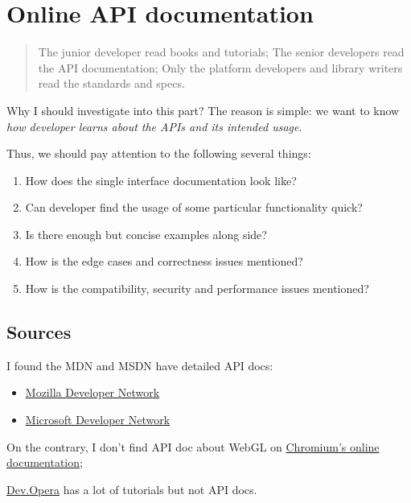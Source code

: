 \section{Online API documentation}\label{online-api-documentation}

\begin{quote}
The junior developer read books and tutorials; The senior developers
read the API documentation; Only the platform developers and library
writers read the standards and specs.
\end{quote}

Why I should investigate into this part? The reason is simple: we want
to know \emph{how developer learns about the APIs and its intended
usage}.

Thus, we should pay attention to the following several things:

\begin{enumerate}
\def\labelenumi{\arabic{enumi}.}
\tightlist
\item
  How does the single interface documentation look like?
\item
  Can developer find the usage of some particular functionality quick?
\item
  Is there enough but concise examples along side?
\item
  How is the edge cases and correctness issues mentioned?
\item
  How is the compatibility, security and performance issues mentioned?
\end{enumerate}

\subsection{Sources}\label{sources}

I found the MDN and MSDN have detailed API docs:

\begin{itemize}
\tightlist
\item
  \href{https://developer.mozilla.org/en-US/docs/Web/API/WebGL_API}{Mozilla
  Developer Network}
\item
  \href{https://msdn.microsoft.com/en-us/library/dn621085(v=vs.85).aspx}{Microsoft
  Developer Network}
\end{itemize}

On the contrary, I don't find API doc about WebGL on
\href{https://www.chromium.org/developers}{Chromium's online
documentation};

\href{http://dev.opera.com}{Dev.Opera} has a lot of tutorials but not
API docs.

